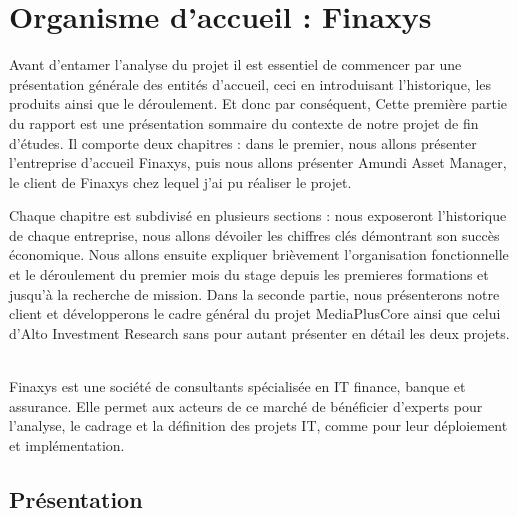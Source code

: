 \setlength{\parskip}{0.8em}



\chapter{Organisme d’accueil : Finaxys}

\label{Chapter01}

\par
Avant d'entamer l’analyse du projet il est essentiel de commencer par une présentation générale des entités d’accueil, ceci en introduisant l'historique, les produits ainsi que le déroulement. Et donc par conséquent, Cette première partie du rapport est une présentation sommaire du contexte de notre projet de fin d’études. Il comporte deux chapitres : dans le premier, nous allons présenter l’entreprise d’accueil Finaxys, puis nous allons présenter Amundi Asset Manager, le client de Finaxys chez lequel j'ai pu réaliser le projet.
\par Chaque chapitre est subdivisé en plusieurs sections : nous exposeront l'historique de chaque entreprise, nous allons dévoiler les chiffres clés démontrant son succès économique. Nous allons ensuite expliquer brièvement l'organisation fonctionnelle et le déroulement du premier mois du stage depuis les premieres formations et jusqu'à la recherche de mission. Dans la seconde partie, nous présenterons notre client et développerons le cadre général du projet MediaPlusCore ainsi que celui d'Alto Investment Research sans pour autant présenter en détail les deux projets.
\\~\\
\par Finaxys est une société de consultants spécialisée en IT finance, banque et assurance. Elle permet aux acteurs de ce marché de bénéficier d’experts pour l’analyse, le cadrage et la définition des projets IT, comme pour leur déploiement et implémentation.

\section{Présentation}

